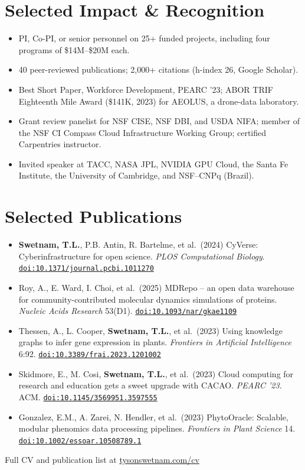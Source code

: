 \documentclass[11pt,letterpaper]{article}
\newcommand{\me}{\textbf{Swetnam, T.L.}}
\newcommand{\doi}[1]{\href{https://doi.org/#1}{\nolinkurl{doi:#1}}}
\begin{document}
\section{Selected Impact \& Recognition}
\begin{itemize}
  \item PI, Co-PI, or senior personnel on 25+ funded projects, including four programs of \$14M--\$20M each.
  \item 40 peer-reviewed publications; 2,000+ citations (h-index 26, Google Scholar).
  \item Best Short Paper, Workforce Development, PEARC '23; ABOR TRIF Eighteenth Mile Award (\$141K, 2023) for AEOLUS, a drone-data laboratory.
  \item Grant review panelist for NSF CISE, NSF DBI, and USDA NIFA; member of the NSF CI Compass Cloud Infrastructure Working Group; certified Carpentries instructor.
  \item Invited speaker at TACC, NASA JPL, NVIDIA GPU Cloud, the Santa Fe Institute, the University of Cambridge, and NSF--CNPq (Brazil).
\end{itemize}

\section{Selected Publications}
\begin{itemize}[label={}, leftmargin=1.2em, itemindent=-1.2em, itemsep=2pt]
  \item \me, P.B. Antin, R. Bartelme, et al.\ (2024) CyVerse: Cyberinfrastructure for open science. \textit{PLOS Computational Biology}. \doi{10.1371/journal.pcbi.1011270}
  \item Roy, A., E. Ward, I. Choi, et al.\ (2025) MDRepo -- an open data warehouse for community-contributed molecular dynamics simulations of proteins. \textit{Nucleic Acids Research} 53(D1). \doi{10.1093/nar/gkae1109}
  \item Thessen, A., L. Cooper, \me, et al.\ (2023) Using knowledge graphs to infer gene expression in plants. \textit{Frontiers in Artificial Intelligence} 6:92. \doi{10.3389/frai.2023.1201002}
  \item Skidmore, E., M. Cosi, \me, et al.\ (2023) Cloud computing for research and education gets a sweet upgrade with CACAO. \textit{PEARC '23}. ACM. \doi{10.1145/3569951.3597555}
  \item Gonzalez, E.M., A. Zarei, N. Hendler, et al.\ (2023) PhytoOracle: Scalable, modular phenomics data processing pipelines. \textit{Frontiers in Plant Science} 14. \doi{10.1002/essoar.10508789.1}
\end{itemize}

\vfill
{\centering\footnotesize Full CV and publication list at \href{https://tysonswetnam.com/cv/}{tysonswetnam.com/cv}\par}
\end{document}
